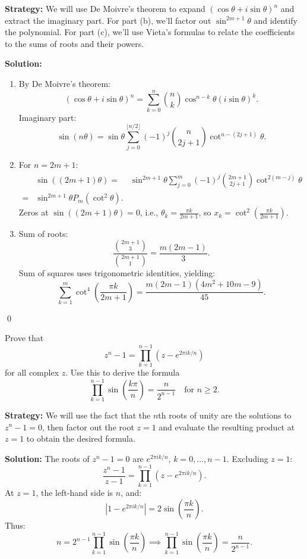 \noindent\textbf{Strategy:} We will use De Moivre's theorem to expand $(\cos \theta + i \sin \theta)^n$ and extract the imaginary part. For part (b), we'll factor out $\sin^{2m+1} \theta$ and identify the polynomial. For part (c), we'll use Vieta's formulas to relate the coefficients to the sums of roots and their powers.

\bigskip\noindent\textbf{Solution:}
\begin{enumerate}[label=\textbf{(\alph*)}]
\item By De Moivre's theorem:
\[
(\cos \theta + i \sin \theta)^n = \sum_{k=0}^n \binom{n}{k} \cos^{n-k} \theta (i \sin \theta)^k.
\]
Imaginary part:
\[
\sin(n\theta) = \sin \theta \sum_{j=0}^{\lfloor n/2 \rfloor} (-1)^j \binom{n}{2j+1} \cot^{n-(2j+1)} \theta.
\]
\item For \( n = 2m+1 \):
\begin{align*}
& \sin((2m+1)\theta) 
=& \sin^{2m+1} \theta \sum_{j=0}^m (-1)^j \binom{2m+1}{2j+1} \cot^{2(m-j)} \theta \\
=& \sin^{2m+1} \theta P_m(\cot^2 \theta).
\end{align*}
Zeros at \( \sin((2m+1)\theta) = 0 \), i.e., \( \theta_k = \frac{\pi k}{2m+1} \), so \( x_k = \cot^2 \left( \frac{\pi k}{2m+1} \right) \).
\item Sum of roots:
\[
\frac{\binom{2m+1}{3}}{\binom{2m+1}{1}} = \frac{m(2m-1)}{3}.
\]
Sum of squares uses trigonometric identities, yielding:
\[
\sum_{k=1}^m \cot^4 \left( \frac{\pi k}{2m+1} \right) = \frac{m(2m-1)(4m^2 + 10m - 9)}{45}.
\]
\end{enumerate}\qed


\begin{problembox}
Prove that
\[
z^n - 1 = \prod_{k=1}^{n-1} \left(z - e^{2\pi i k/n}\right)
\]
for all complex \( z \). Use this to derive the formula
\[
\prod_{k=1}^{n-1} \sin \left( \frac{k\pi}{n} \right) = \frac{n}{2^{n-1}} \quad \text{for } n \geq 2.
\]
\end{problembox}

\noindent\textbf{Strategy:} We will use the fact that the $n$th roots of unity are the solutions to $z^n - 1 = 0$, then factor out the root $z = 1$ and evaluate the resulting product at $z = 1$ to obtain the desired formula.

\bigskip\noindent\textbf{Solution:}
The roots of \( z^n - 1 = 0 \) are \( e^{2\pi i k/n} \), \( k = 0, \ldots, n-1 \). Excluding \( z = 1 \):
\[
\frac{z^n - 1}{z - 1} = \prod_{k=1}^{n-1} (z - e^{2\pi i k/n}).
\]
At \( z = 1 \), the left-hand side is \( n \), and:
\[
|1 - e^{2\pi i k/n}| = 2 \sin\left( \frac{\pi k}{n} \right).
\]
Thus:
\[
n = 2^{n-1} \prod_{k=1}^{n-1} \sin\left( \frac{\pi k}{n} \right) \implies \prod_{k=1}^{n-1} \sin\left( \frac{\pi k}{n} \right) = \frac{n}{2^{n-1}}.
\]

